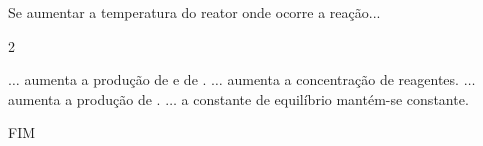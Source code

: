 \documentclass[addpoints]{exam}
\begin{document}
\begin{questions}
		\vspace{5pt}
		\question[8] Se aumentar a temperatura do reator onde ocorre a reação...
		
		\begin{multicols}{2}
			\begin{choices}
				\choice $\ldots$ aumenta a produção de  e de .
				\choice $\ldots$ aumenta a concentração de reagentes.
				\correctchoice $\ldots$ aumenta a produção de .
				\choice $\ldots$ a constante de equilíbrio mantém-se constante.
			\end{choices}
		\end{multicols}
		
	\end{questions}
	
	\vspace{10pt}
	\center
	FIM
	
	\vfill
	\center
	\pointtable[h]
\end{document}
